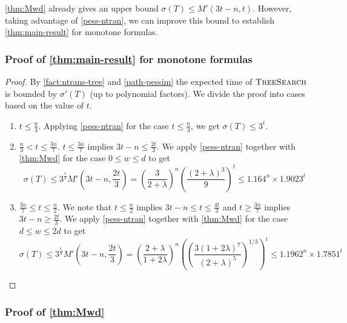 \documentclass[10pt,a4paper]{article}
\newcommand{\total}{\sigma}
\newcommand{\ts}{\textsc{TreeSearch}}
\begin{document}
\cref{thm:Mwd} already gives an upper bound $\total(T) \le M'(3t - n, t)$. 
However, taking advantage 
of \cref{pess-ntran},
we can improve this bound 
to establish
\cref{thm:main-result} for monotone formulas.  

\subsubsection{Proof of \cref{thm:main-result} for monotone formulas}

\begin{proof}
\label{proof:monotone-main-result}
By \cref{fact:ntrans-tree} and \cref{path-pessim} the expected time of $\ts$ is bounded by 
$\total'(T)$ (up to polynomial factors). 
We divide the proof into cases based on the value of $t$.
\begin{enumerate}[label=\textbf{Case \arabic*:}, itemindent=*, leftmargin=0em]

\item
$t\le \frac{n}{3}$. Applying \cref{pess-ntran} for the case $t\le \frac{n}{3}$, we 
get $\total(T) \le 3^t$.

\item
$\frac{n}{3} < t \le \frac{3n}{7}$.
$t \le \frac{3n}{7}$ implies $3t-n \le \frac{2t}{3}$.
We apply
\cref{pess-ntran} together with 
\cref{thm:Mwd} for the case $0\le w\le d$ to get 
\[
\total(T) \le 3^{\frac{t}{3}} M'\left(3t-n, \frac{2t}{3}\right) = \left(\frac{3}{2+\lambda}\right)^n\left(\frac{(2+\lambda)^3}{9}\right)^t \le 1.164^n \times 1.9023^t
\]

\item
$\frac{3n}{7}\le t \le \frac{n}{2}$. 
We note that $t \le \frac{n}{2}$ implies 
$3t-n \le t \le \frac{4t}{3}$ and $t \ge \frac{3n}{7}$ implies $3t-n \ge \frac{2t}{3}$. 
We apply
\cref{pess-ntran} together with 
\cref{thm:Mwd} for the case $d\le w\le 2d$ to get 
\[
\total(T) \le 3^{\frac{t}{3}} M'\left(3t-n, \frac{2t}{3}\right) = \left(\frac{2+\lambda}{1+2\lambda}\right)^n \left(\left(\frac{3(1+2\lambda)^{7}}{(2+\lambda)^{5}}\right)^{1/3}\right)^t \le 1.1962^n \times 1.7851^t
\]
\end{enumerate}
\end{proof}

\subsubsection{Proof of \cref{thm:Mwd}}
\end{document}

